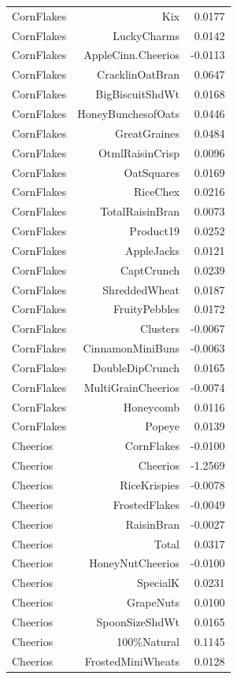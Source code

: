 \begin{longtable}{@{}lrr@{}}
CornFlakes & Kix & 0.0177 \\
CornFlakes & LuckyCharms & 0.0142 \\
CornFlakes & AppleCinn.Cheerios & -0.0113 \\
CornFlakes & CracklinOatBran & 0.0647 \\
CornFlakes & BigBiscuitShdWt & 0.0168 \\
CornFlakes & HoneyBunchesofOats & 0.0446 \\
CornFlakes & GreatGraines & 0.0484 \\
CornFlakes & OtmlRaisinCrisp & 0.0096 \\
CornFlakes & OatSquares & 0.0169 \\
CornFlakes & RiceChex & 0.0216 \\
CornFlakes & TotalRaisinBran & 0.0073 \\
CornFlakes & Product19 & 0.0252 \\
CornFlakes & AppleJacks & 0.0121 \\
CornFlakes & CaptCrunch & 0.0239 \\
CornFlakes & ShreddedWheat & 0.0187 \\
CornFlakes & FruityPebbles & 0.0172 \\
CornFlakes & Clusters & -0.0067 \\
CornFlakes & CinnamonMiniBuns & -0.0063 \\
CornFlakes & DoubleDipCrunch & 0.0165 \\
CornFlakes & MultiGrainCheerios & -0.0074 \\
CornFlakes & Honeycomb & 0.0116 \\
CornFlakes & Popeye & 0.0139 \\
Cheerios & CornFlakes & -0.0100 \\
Cheerios & Cheerios & -1.2569 \\
Cheerios & RiceKrispies & -0.0078 \\
Cheerios & FrostedFlakes & -0.0049 \\
Cheerios & RaisinBran & -0.0027 \\
Cheerios & Total & 0.0317 \\
Cheerios & HoneyNutCheerios & -0.0100 \\
Cheerios & SpecialK & 0.0231 \\
Cheerios & GrapeNuts & 0.0100 \\
Cheerios & SpoonSizeShdWt & 0.0165 \\
Cheerios & 100\%Natural & 0.1145 \\
Cheerios & FrostedMiniWheats & 0.0128 \\

\end{longtable}
